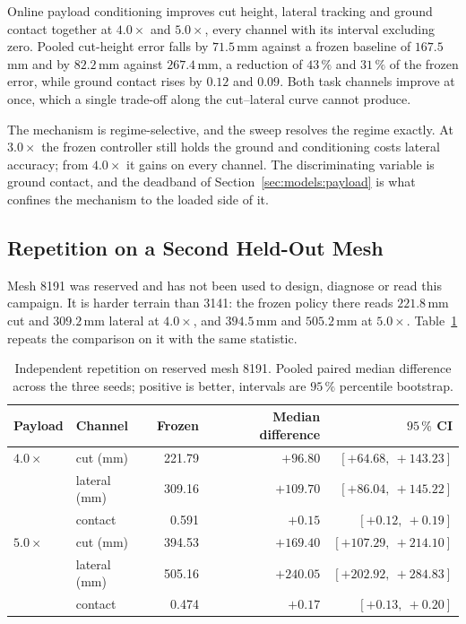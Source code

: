 Online payload conditioning improves cut height, lateral tracking and ground
contact together at $4.0\times$ and $5.0\times$, every channel with its interval
excluding zero. Pooled cut-height error falls by $71.5\,$mm against a frozen
baseline of $167.5\,$mm and by $82.2\,$mm against $267.4\,$mm, a reduction of
$43\,\%$ and $31\,\%$ of the frozen error, while ground contact rises by $0.12$
and $0.09$. Both task channels improve at once, which a single trade-off along
the cut--lateral curve cannot produce.

The mechanism is regime-selective, and the sweep resolves the regime exactly.
At $3.0\times$ the frozen controller still holds the ground and conditioning
costs lateral accuracy; from $4.0\times$ it gains on every channel. The
discriminating variable is ground contact, and the deadband of
Section~\ref{sec:models:payload} is what confines the mechanism to the loaded
side of it.

\subsection{Repetition on a Second Held-Out Mesh}

Mesh 8191 was reserved and has not been used to design, diagnose or read this
campaign. It is harder terrain than 3141: the frozen policy there reads
$221.8$\,mm cut and $309.2$\,mm lateral at $4.0\times$, and $394.5$\,mm and
$505.2$\,mm at $5.0\times$. Table~\ref{tab:eval:mesh8191} repeats the comparison
on it with the same statistic.

\begin{table}[H]
  \centering
  \caption{Independent repetition on reserved mesh 8191. Pooled paired median
  difference across the three seeds; positive is better, intervals are
  $95\,\%$ percentile bootstrap.}
  \label{tab:eval:mesh8191}
  \small
  \begin{tabular}{@{}llrrr@{}}
    \toprule
    Payload & Channel & Frozen & Median difference & $95\,\%$ CI \\
    \midrule
    $4.0\times$ & cut (mm)     & 221.79 &  $+96.80$ & $[+64.68,\ +143.23]$ \\
                & lateral (mm) & 309.16 & $+109.70$ & $[+86.04,\ +145.22]$ \\
                & contact      &  0.591 &   $+0.15$ & $[+0.12,\ +0.19]$ \\
    \midrule
    $5.0\times$ & cut (mm)     & 394.53 & $+169.40$ & $[+107.29,\ +214.10]$ \\
                & lateral (mm) & 505.16 & $+240.05$ & $[+202.92,\ +284.83]$ \\
                & contact      &  0.474 &   $+0.17$ & $[+0.13,\ +0.20]$ \\
    \bottomrule
  \end{tabular}
\end{table}


